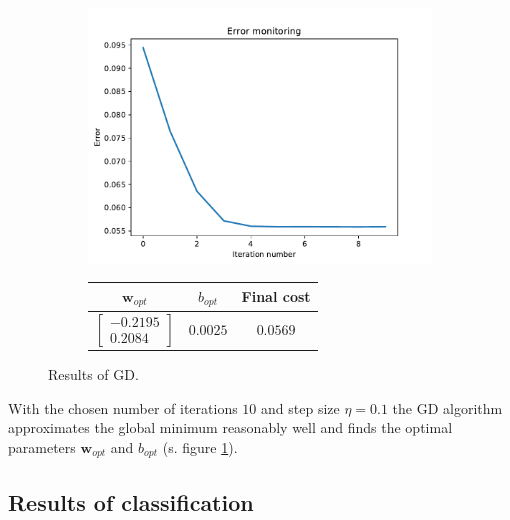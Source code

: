 \documentclass{article}
\begin{document}
\begin{figure}[!ht]
\parbox[b]{\textwidth}{
\begin{subfigure}{0.6\textwidth}
\includegraphics[width=\textwidth]{./Figures/4_error}
\end{subfigure}
\begin{subfigure}{0.4\textwidth}
\begin{tabular}{|c|c|c|} \hline
$\mathbf{w}_{opt}$ & $b_{opt}$ & Final cost\\ \hline
$ \left[\begin{array}{r} -0.2195 \\ 0.2084 \end{array} \right]$ & $0.0025$ & $0.0569$\\ \hline
\end{tabular}
\end{subfigure}
}
\caption{Results of GD.}
\label{4_GD}
\end{figure}

With the chosen number of iterations $10$ and step size $\eta=0.1$ the GD algorithm approximates the global minimum reasonably well and finds the optimal parameters $\mathbf{w}_{opt}$ and $b_{opt}$ (s. figure \ref{4_GD}).

\subsection{Results of classification}
\end{document}
